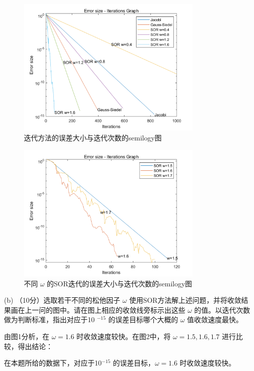 \documentclass[12pt,a4paper,UTF8]{ctexart}
\begin{document}
\begin{enumerate}
          \begin{figure}[H]
              \centering
              \includegraphics[width=0.8\textwidth]{q.png}
              \caption{迭代方法的误差大小与迭代次数的semilogy图}
          \end{figure}
          \begin{figure}[H]
              \centering
              \includegraphics[width=0.8\textwidth]{2.png}
              \caption{不同 $\omega$ 的SOR迭代的误差大小与迭代次数的semilogy图}
          \end{figure}
          (b) （10分）选取若干不同的松他因子 $\omega$ 使用SOR方法解上述问题，并将收敛结果画在上一问的图中。请在图上相应的收敛线旁标示出这些 $\omega$ 的值。以迭代次数做为判断标准，指出对应于10 $^{-15}$ 的误差目标哪个大概的 $\omega$ 值收敛速度最快。

          由图1分析，在 $\omega = 1.6$ 时收敛速度较快。在图2中，将 $\omega = 1.5, 1.6, 1.7$ 进行比较，得出结论：

          在本题所给的数据下，对应于10$^{-15}$ 的误差目标，$\omega = 1.6$ 时收敛速度较快。


\end{enumerate}
\end{document}

